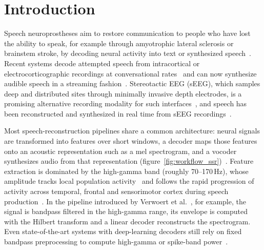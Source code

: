 \documentclass{iopjournal}
\begin{document}
\section{Introduction}

Speech neuroprostheses aim to restore communication to people who have lost the ability to speak, for example through amyotrophic lateral sclerosis or brainstem stroke, by decoding neural activity into text or synthesized speech~\cite{Silva2024}. Recent systems decode attempted speech from intracortical or electrocorticographic recordings at conversational rates~\cite{Moses2021,Metzger2023,Willett2023,Card2024} and can now synthesize audible speech in a streaming fashion~\cite{Littlejohn2025,Wairagkar2025}. Stereotactic EEG (sEEG), which samples deep and distributed sites through minimally invasive depth electrodes, is a promising alternative recording modality for such interfaces~\cite{Herff2020}, and speech has been reconstructed and synthesized in real time from sEEG recordings~\cite{Angrick2021,dataset}.

Most speech-reconstruction pipelines share a common architecture: neural signals are transformed into features over short windows, a decoder maps those features onto an acoustic representation such as a mel spectrogram, and a vocoder synthesizes audio from that representation (figure~\ref{fig:workflow_ssr})~\cite{Herff2019,Angrick2019,Anumanchipalli2019}. Feature extraction is dominated by the high-gamma band (roughly 70--170\,Hz), whose amplitude tracks local population activity~\cite{Crone2006,Ray2011} and follows the rapid progression of activity across temporal, frontal and sensorimotor cortex during speech production~\cite{Flinker2015,Bouchard2013}. In the pipeline introduced by Verwoert et al.~\cite{dataset}, for example, the signal is bandpass filtered in the high-gamma range, its envelope is computed with the Hilbert transform and a linear decoder reconstructs the spectrogram. Even state-of-the-art systems with deep-learning decoders still rely on fixed bandpass preprocessing to compute high-gamma or spike-band power~\cite{Metzger2023,Littlejohn2025,Wairagkar2025}.
\end{document}
